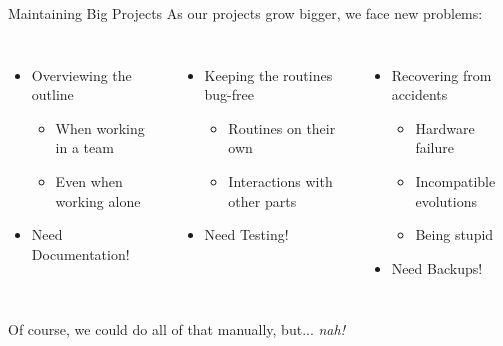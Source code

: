
\begin{frame}{Maintaining Big Projects}
%
As our projects grow bigger, we face new problems:
\begin{columns}[T]
\begin{itemize}
\item Overviewing the outline
	\begin{itemize}
	\item When working in a team
	\item Even when working alone
	\end{itemize}
\item[\Thus] Need Documentation!
\end{itemize}
%
\begin{itemize}
\item Keeping the routines bug-free
	\begin{itemize}
	\item Routines on their own
	\item Interactions with other parts
	\end{itemize}
\item[\Thus] Need Testing!
\end{itemize}
%
\begin{itemize}
\item Recovering from accidents
	\begin{itemize}
	\item Hardware failure
	\item Incompatible evolutions
	\item Being stupid
	\end{itemize}
\item[\Thus] Need Backups!
\end{itemize}
\end{columns}
%

\vspace{12pt}
Of course, we could do all of that manually, but... \emph{nah!}
%
\end{frame}



